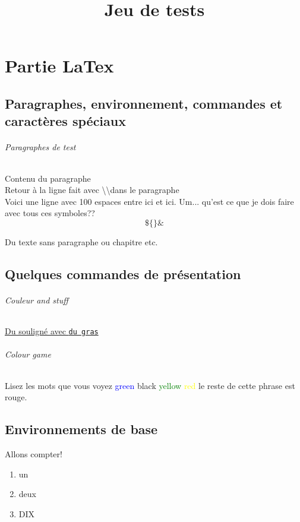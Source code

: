 \documentclass{report}
\title{Jeu de tests}
\begin{document}
\maketitle
\tableofcontents
\part{Partie LaTex}
\chapter{Paragraphes, environnement, commandes et caractères spéciaux}
\paragraph{Paragraphes de test}{Contenu du paragraphe \\Retour à la ligne fait avec \textbackslash \textbackslash dans le paragraphe
\\Voici une ligne avec 100 espaces entre ici                        et ici.}
Um... qu'est ce que je dois faire avec tous ces symboles?? \[\$\{\}\&\]

Du texte sans paragraphe ou chapitre etc.

\chapter{Quelques commandes de présentation}
\paragraph{Couleur and stuff}{\underline{Du souligné avec \texttt{du gras}}}
\paragraph{Colour game}{

Lisez les mots que vous voyez \textcolor{blue}{green} black \textcolor{green}{yellow} \textcolor{yellow}{red} \color{red}le reste de cette phrase est rouge.}


\chapter{Environnements de base}
Allons compter!
\begin{enumerate}
\item un 
\item deux
\item DIX
\end{enumerate}
\end{document}
